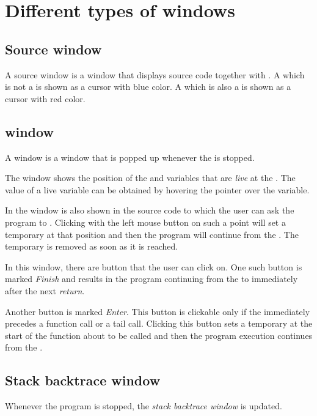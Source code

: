 \chapter{Different types of windows}

\section{Source window}
\label{sec-windows-source}

A source window is a window that displays source code together with
\pollpoints{}.  A \pollpoint{} which is not a \breakpoint{} is shown
as a cursor with blue color.  A \pollpoint{} which is also a
\breakpoint{} is shown as a cursor with red color.

\section{\Stoppingpoint{} window}
\label{sec-windows-stopping-point}

A \stoppingpoint{} window is a window that is popped up whenever 
the \applicationthread{} is stopped.

The \stoppingpoint{} window shows the position of the \stoppingpoint{}
and variables that are \emph{live} at the \stoppingpoint{}.  The value
of a live variable can be obtained by hovering the pointer over the
variable.

In the \stoppingpoint{} window is also shown \pollpoints{} in the
source code to which the user can ask the program to \emph{\dvance{}}.
Clicking with the left mouse button on such a point will set a
temporary \stoppingpoint{} at that position and then the program will
continue from the \stoppingpoint{}.  The temporary \stoppingpoint{} is
removed as soon as it is reached.

In this window, there are button that the user can click on.  One such
button is marked \emph{Finish} and results in the program continuing
from the \stoppingpoint{} to immediately after the next \emph{return}.

Another button is marked \emph{Enter}.  This button is clickable only
if the \stoppingpoint{} immediately precedes a function call or a tail
call.  Clicking this button sets a temporary \stoppingpoint{} at the
start of the function about to be called and then the program
execution continues from the \stoppingpoint{}.

\section{Stack backtrace window}

Whenever the program is stopped, the \emph{stack backtrace window} is
updated.
